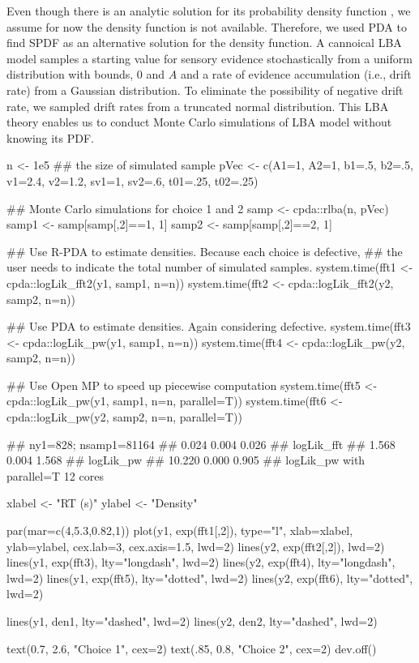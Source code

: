 \documentclass[shortnames,nojss,article]{jss}
\begin{document}
Even though there is an analytic solution for its probability density
function \citep{brown_simplest_2008}, we assume for now the density function is
not available. Therefore, we used PDA to find SPDF as an alternative solution
for the density function. A cannoical LBA model samples a starting value for
sensory evidence stochastically from a uniform distribution with bounds, 0 and
$A$ and a rate of evidence accumulation (i.e., drift rate) from a Gaussian
distribution. To eliminate the possibility of negative drift rate, we sampled
drift rates from a truncated normal distribution. This LBA theory enables us
to conduct Monte Carlo simulations of LBA model without knowing its PDF.


\begin{Code}
n    <- 1e5          ## the size of simulated sample
pVec <- c(A1=1, A2=1, b1=.5, b2=.5, v1=2.4, v2=1.2, sv1=1, sv2=.6, 
          t01=.25, t02=.25)

## Monte Carlo simulations for choice 1 and 2
samp  <- cpda::rlba(n, pVec)
samp1 <- samp[samp[,2]==1, 1]
samp2 <- samp[samp[,2]==2, 1]

## Use R-PDA to estimate densities. Because each choice is defective,  
## the user needs to indicate the total number of simulated samples. 
system.time(fft1 <- cpda::logLik_fft2(y1, samp1, n=n))
system.time(fft2 <- cpda::logLik_fft2(y2, samp2, n=n))

## Use PDA to estimate densities. Again considering defective.
system.time(fft3 <- cpda::logLik_pw(y1, samp1, n=n))
system.time(fft4 <- cpda::logLik_pw(y2, samp2, n=n))

## Use Open MP to speed up piecewise computation
system.time(fft5 <- cpda::logLik_pw(y1, samp1, n=n, parallel=T))
system.time(fft6 <- cpda::logLik_pw(y2, samp2, n=n, parallel=T))

## ny1=828; nsamp1=81164
## 0.024   0.004   0.026   ## logLik_fft
## 1.568   0.004   1.568   ## logLik_pw
## 10.220  0.000   0.905   ## logLik_pw with parallel=T 12 cores

\end{Code}
%


\begin{Code}
xlabel <- "RT (s)"
ylabel <- "Density"

par(mar=c(4,5.3,0.82,1))
plot(y1, exp(fft1[,2]), type="l", xlab=xlabel, ylab=ylabel, cex.lab=3, 
     cex.axis=1.5, lwd=2)
lines(y2, exp(fft2[,2]), lwd=2)
lines(y1, exp(fft3), lty="longdash", lwd=2)
lines(y2, exp(fft4), lty="longdash", lwd=2)
lines(y1, exp(fft5), lty="dotted", lwd=2)
lines(y2, exp(fft6), lty="dotted", lwd=2)

lines(y1, den1, lty="dashed", lwd=2)
lines(y2, den2, lty="dashed", lwd=2)

text(0.7, 2.6, "Choice 1", cex=2)
text(.85,  0.8, "Choice 2", cex=2)
dev.off()
\end{Code}
%
\end{document}
